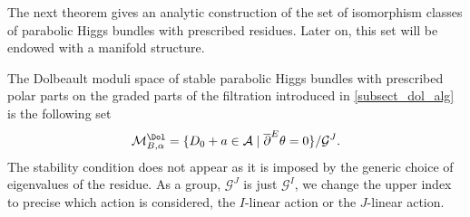 The next theorem gives an analytic construction of the set of isomorphism classes of parabolic Higgs bundles with prescribed residues.
Later on, this set will be endowed with a manifold structure.
\begin{theorem}
The Dolbeault moduli space of stable parabolic Higgs bundles with prescribed polar parts on the graded parts of the filtration introduced in \ref{subsect_dol_alg} is the following set
\[
\mathcal{M}^{\Dol}_{B, \alpha} =\lbrace D_0 + a \in \mathcal{A} \mid \overline{\partial}^E \theta =0\rbrace/ \mathcal{G}^{J}.
\]
The stability condition does not appear as it is imposed by the generic choice of eigenvalues of the residue. As a group, $\mathcal{G}^J$ is just $\mathcal{G}^I$, we change the upper index to precise which action is considered, the $I$-linear action or the $J$-linear action.
\end{theorem}

